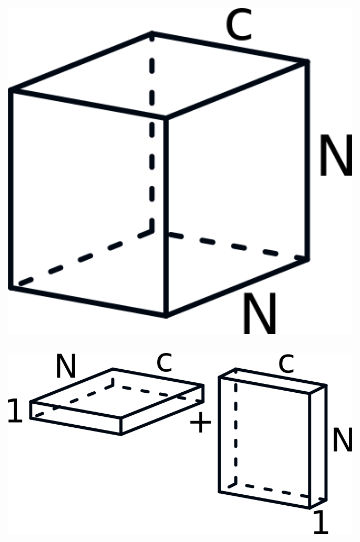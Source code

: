 \documentclass{kththesis}
\begin{document}
\begin{figure}[h]
    \centering
    \begin{subfigure}[b]{0.3\textwidth}
        \includegraphics[width=\textwidth]{conv}
    \end{subfigure}
    \qquad %
    \begin{subfigure}[b]{0.45\textwidth}
        \includegraphics[width=\textwidth]{assymConv}
      \end{subfigure}


\end{figure}
\end{document}
